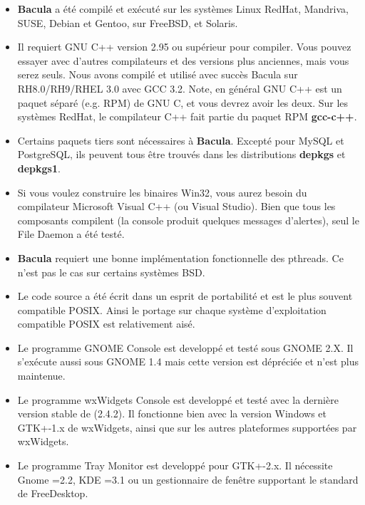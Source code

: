 \begin{itemize}
\item {\bf Bacula} a \'et\'e compil\'e et ex\'ecut\'e sur  les syst\`emes
   Linux RedHat, Mandriva, SUSE, Debian et Gentoo, sur FreeBSD, et Solaris. 
\item Il requiert GNU C++ version 2.95 ou sup\'erieur pour compiler. Vous 
   pouvez essayer avec d'autres compilateurs et des versions plus anciennes,  mais
   vous serez seuls.  Nous avons compil\'e et utilis\'e avec succ\`es Bacula sur 
RH8.0/RH9/RHEL 3.0 avec GCC 3.2. Note, en g\'en\'eral GNU C++ est un  paquet
s\'epar\'e (e.g. RPM) de GNU C, et vous devrez avoir les deux. Sur les
syst\`emes RedHat, le compilateur C++ fait partie du paquet RPM {\bf
gcc-c++}. 
\item Certains paquets tiers sont n\'ecessaires \`a {\bf Bacula}. 
   Except\'e pour MySQL et PostgreSQL, ils peuvent tous \^etre  trouv\'es dans
   les distributions {\bf depkgs} et {\bf depkgs1}. 
\item Si vous voulez construire les binaires Win32, vous aurez besoin du 
   compilateur Microsoft Visual C++ (ou Visual Studio).  Bien que tous les
   composants compilent (la console produit quelques messages  d'alertes), seul
le File Daemon a \'et\'e  test\'e. 
\item {\bf Bacula} requiert une bonne impl\'ementation fonctionnelle des
   pthreads.  Ce n'est pas le cas sur certains syst\`emes BSD. 
\item Le code source a \'et\'e \'ecrit dans un esprit de  portabilit\'e et est
   le plus souvent compatible POSIX.  Ainsi le portage sur chaque syst\`eme
   d'exploitation  compatible POSIX est relativement ais\'e. 
\item Le programme GNOME Console est developp\'e et test\'e sous GNOME  2.X.
   Il s'ex\'ecute aussi sous GNOME 1.4 mais cette version est  d\'epr\'eci\'ee et
   n'est plus maintenue. 
\item Le programme wxWidgets Console est developp\'e et test\'e avec la 
   derni\`ere version stable de 
    (2.4.2). Il fonctionne  bien
avec la version Windows et GTK+-1.x de wxWidgets, ainsi que  sur les autres
plateformes support\'ees par wxWidgets. 
\item Le programme Tray Monitor est developp\'e pour GTK+-2.x.  Il n\'ecessite
   Gnome \gt{}=2.2, KDE \gt{}=3.1 ou un  gestionnaire de fen\^etre supportant le
   standard 
 de 
FreeDesktop. 

\end{itemize}
